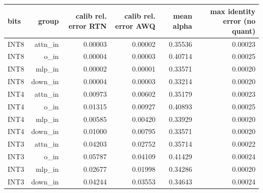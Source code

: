 \begin{tabular}{lrrrrr}
\toprule
bits & group & calib rel. error RTN & calib rel. error AWQ & mean alpha & max identity error (no quant) \\
\midrule
INT8 & attn\_in & 0.00003 & 0.00002 & 0.35536 & 0.00023 \\
INT8 & o\_in & 0.00004 & 0.00003 & 0.40714 & 0.00025 \\
INT8 & mlp\_in & 0.00002 & 0.00001 & 0.33571 & 0.00020 \\
INT8 & down\_in & 0.00004 & 0.00003 & 0.33214 & 0.00020 \\
INT4 & attn\_in & 0.00973 & 0.00602 & 0.35179 & 0.00023 \\
INT4 & o\_in & 0.01315 & 0.00927 & 0.40893 & 0.00025 \\
INT4 & mlp\_in & 0.00585 & 0.00420 & 0.33929 & 0.00020 \\
INT4 & down\_in & 0.01000 & 0.00795 & 0.33571 & 0.00020 \\
INT3 & attn\_in & 0.04203 & 0.02752 & 0.35714 & 0.00022 \\
INT3 & o\_in & 0.05787 & 0.04109 & 0.41429 & 0.00024 \\
INT3 & mlp\_in & 0.02677 & 0.01998 & 0.34286 & 0.00020 \\
INT3 & down\_in & 0.04244 & 0.03553 & 0.34643 & 0.00024 \\
\bottomrule
\end{tabular}

